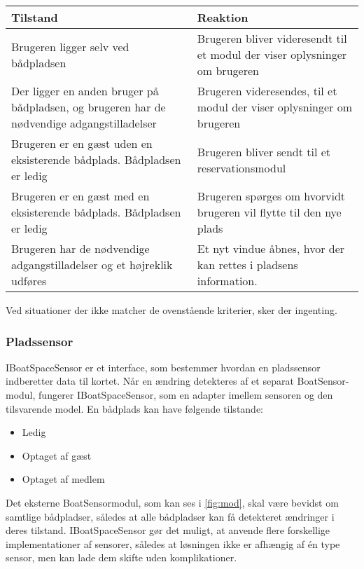 \begin{tabu} to \textwidth {XX}
  \toprule
  \textbf{Tilstand} & \textbf{Reaktion} \\
   \midrule
   Brugeren ligger selv ved bådpladsen & Brugeren bliver videresendt til et modul der viser oplysninger om brugeren \\
   \midrule
  Der ligger en anden bruger på bådpladsen, og brugeren har de nødvendige adgangstilladelser & Brugeren videresendes, til et modul der viser oplysninger om brugeren \\
  \midrule
   Brugeren er en gæst uden en eksisterende bådplads. Bådpladsen er ledig & Brugeren bliver sendt til et reservationsmodul \\ 
   \midrule
   Brugeren er en gæst med en eksisterende bådplads. Bådpladsen er ledig & Brugeren spørges om hvorvidt brugeren vil flytte til den nye plads \\
   \midrule
   Brugeren har de nødvendige adgangstilladelser og et højreklik udføres & Et nyt vindue åbnes, hvor der kan rettes i pladsens information. \\
   \bottomrule 
\end{tabu}


Ved situationer der ikke matcher de ovenstående kriterier, sker der ingenting.


\subsubsection{Pladssensor}
\label{sub:map_sensor_interface}

IBoatSpaceSensor er et interface, som bestemmer hvordan en pladssensor indberetter data til kortet. Når en ændring detekteres af et separat BoatSensor-modul, fungerer IBoatSpaceSensor, som en adapter imellem sensoren og den tilsvarende model. En bådplads kan have følgende tilstande:

\begin{itemize}
  \item Ledig
  \item Optaget af gæst
  \item Optaget af medlem
\end{itemize}

Det eksterne BoatSensormodul, som kan ses i \cref{fig:mod}, skal være bevidst om samtlige bådpladser, således at alle bådpladser kan få detekteret ændringer i deres tilstand. IBoatSpaceSensor gør det muligt, at anvende flere forskellige implementationer af sensorer, således at løsningen ikke er afhængig af én type sensor, men kan lade dem skifte uden komplikationer.
